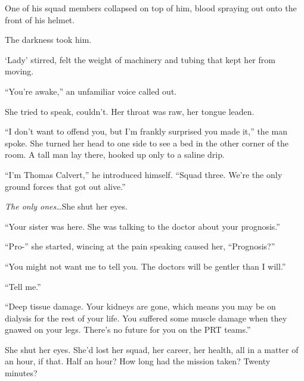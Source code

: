 One of his squad members collapsed on top of him, blood spraying out onto the front of his helmet.



The darkness took him.



\sectionbreak



`Lady' stirred, felt the weight of machinery and tubing that kept her from moving.



``You're awake,'' an unfamiliar voice called out.



She tried to speak, couldn't.  Her throat was raw, her tongue leaden.



``I don't want to offend you, but I'm frankly surprised you made it,'' the man spoke.  She turned her head to one side to see a bed in the other corner of the room.  A tall man lay there, hooked up only to a saline drip.



``I'm Thomas Calvert,'' he introduced himself.  ``Squad three.  We're the only ground forces that got out alive.''



\emph{The only ones}\ldots  She shut her eyes.



``Your sister was here.  She was talking to the doctor about your prognosis.''



``Pro-'' she started, wincing at the pain speaking caused her, ``Prognosis?''



``You might not want me to tell you.  The doctors will be gentler than I will.''



``Tell me.''



``Deep tissue damage.  Your kidneys are gone, which means you may be on dialysis for the rest of your life.  You suffered some muscle damage when they gnawed on your legs.  There's no future for you on the PRT teams.''



She shut her eyes.  She'd lost her squad, her career, her health, all in a matter of an hour, if that.  Half an hour?  How long had the mission taken?  Twenty minutes?



